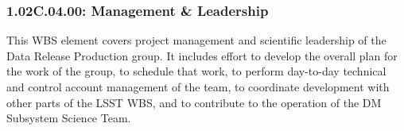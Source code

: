\subsubsection{1.02C.04.00: Management \& Leadership}

This WBS element covers project management and scientific leadership of the
Data Release Production group. It includes effort to develop the overall plan
for the work of the group, to schedule that work, to perform day-to-day
technical and control account management of the team, to coordinate
development with other parts of the LSST WBS, and to contribute to the
operation of the DM Subsystem Science Team.
